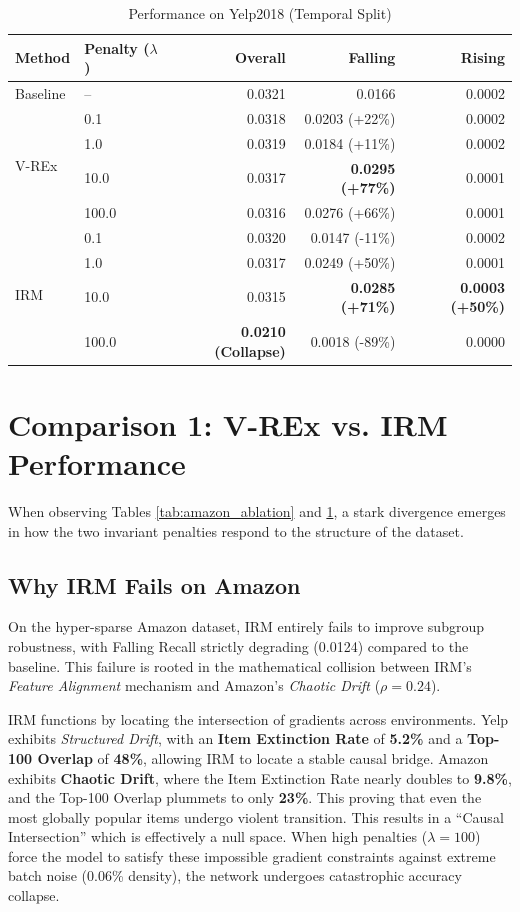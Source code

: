 \documentclass{article}
\begin{document}
\begin{table}[h!]
    \centering
    \caption{Performance on Yelp2018 (Temporal Split)}
    \label{tab:yelp_ablation}
    \begin{tabular}{llrrr}
        \toprule
        \textbf{Method} & \textbf{Penalty ($\lambda$)} & \textbf{Overall} & \textbf{Falling} & \textbf{Rising} \\
        \midrule
        Baseline & -- & 0.0321 & 0.0166 & 0.0002 \\
        \midrule
        \multirow{4}{*}{V-REx}
        & 0.1 & 0.0318 & 0.0203 (+22\%) & 0.0002 \\
        & 1.0 & 0.0319 & 0.0184 (+11\%) & 0.0002 \\
        & 10.0 & 0.0317 & \textbf{0.0295 (+77\%)} & 0.0001 \\
        & 100.0 & 0.0316 & 0.0276 (+66\%) & 0.0001 \\
        \midrule
        \multirow{4}{*}{IRM}
        & 0.1 & 0.0320 & 0.0147 (-11\%) & 0.0002 \\
        & 1.0 & 0.0317 & 0.0249 (+50\%) & 0.0001 \\
        & 10.0 & 0.0315 & \textbf{0.0285 (+71\%)} & \textbf{0.0003 (+50\%)} \\
        & 100.0 & \textbf{0.0210 (Collapse)} & 0.0018 (-89\%) & 0.0000 \\
        \bottomrule
    \end{tabular}
\end{table}

\section{Comparison 1: V-REx vs. IRM Performance}
When observing Tables \ref{tab:amazon_ablation} and \ref{tab:yelp_ablation}, a stark divergence emerges in how the two invariant penalties respond to the structure of the dataset.

\subsection{Why IRM Fails on Amazon}
On the hyper-sparse Amazon dataset, IRM entirely fails to improve subgroup robustness, with Falling Recall strictly degrading (0.0124) compared to the baseline. This failure is rooted in the mathematical collision between IRM's \textit{Feature Alignment} mechanism and Amazon's \textit{Chaotic Drift} ($\rho = 0.24$). 

IRM functions by locating the intersection of gradients across environments. Yelp exhibits \textit{Structured Drift}, with an \textbf{Item Extinction Rate} of \textbf{5.2\%} and a \textbf{Top-100 Overlap} of \textbf{48\%}, allowing IRM to locate a stable causal bridge. Amazon exhibits \textbf{Chaotic Drift}, where the Item Extinction Rate nearly doubles to \textbf{9.8\%}, and the Top-100 Overlap plummets to only \textbf{23\%}. This proving that even the most globally popular items undergo violent transition. This results in a ``Causal Intersection'' which is effectively a null space. When high penalties ($\lambda=100$) force the model to satisfy these impossible gradient constraints against extreme batch noise (0.06\% density), the network undergoes catastrophic accuracy collapse.
\end{document}
